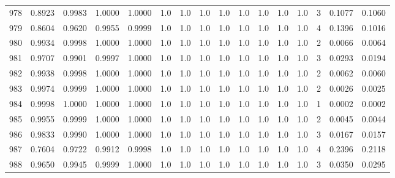 \begin{tabular}{lrrrrrrrrrrrrrrr}
978 &      0.8923 &  0.9983 &  1.0000 &  1.0000 &     1.0 &     1.0 &     1.0 &     1.0 &     1.0 &     1.0 &      1.0 &        1.0 &      3 &                    0.1077 &                     0.1060 \\
979 &      0.8604 &  0.9620 &  0.9955 &  0.9999 &     1.0 &     1.0 &     1.0 &     1.0 &     1.0 &     1.0 &      1.0 &        1.0 &      4 &                    0.1396 &                     0.1016 \\
980 &      0.9934 &  0.9998 &  1.0000 &  1.0000 &     1.0 &     1.0 &     1.0 &     1.0 &     1.0 &     1.0 &      1.0 &        1.0 &      2 &                    0.0066 &                     0.0064 \\
981 &      0.9707 &  0.9901 &  0.9997 &  1.0000 &     1.0 &     1.0 &     1.0 &     1.0 &     1.0 &     1.0 &      1.0 &        1.0 &      3 &                    0.0293 &                     0.0194 \\
982 &      0.9938 &  0.9998 &  1.0000 &  1.0000 &     1.0 &     1.0 &     1.0 &     1.0 &     1.0 &     1.0 &      1.0 &        1.0 &      2 &                    0.0062 &                     0.0060 \\
983 &      0.9974 &  0.9999 &  1.0000 &  1.0000 &     1.0 &     1.0 &     1.0 &     1.0 &     1.0 &     1.0 &      1.0 &        1.0 &      2 &                    0.0026 &                     0.0025 \\
984 &      0.9998 &  1.0000 &  1.0000 &  1.0000 &     1.0 &     1.0 &     1.0 &     1.0 &     1.0 &     1.0 &      1.0 &        1.0 &      1 &                    0.0002 &                     0.0002 \\
985 &      0.9955 &  0.9999 &  1.0000 &  1.0000 &     1.0 &     1.0 &     1.0 &     1.0 &     1.0 &     1.0 &      1.0 &        1.0 &      2 &                    0.0045 &                     0.0044 \\
986 &      0.9833 &  0.9990 &  1.0000 &  1.0000 &     1.0 &     1.0 &     1.0 &     1.0 &     1.0 &     1.0 &      1.0 &        1.0 &      3 &                    0.0167 &                     0.0157 \\
987 &      0.7604 &  0.9722 &  0.9912 &  0.9998 &     1.0 &     1.0 &     1.0 &     1.0 &     1.0 &     1.0 &      1.0 &        1.0 &      4 &                    0.2396 &                     0.2118 \\
988 &      0.9650 &  0.9945 &  0.9999 &  1.0000 &     1.0 &     1.0 &     1.0 &     1.0 &     1.0 &     1.0 &      1.0 &        1.0 &      3 &                    0.0350 &                     0.0295 \\

\end{tabular}
